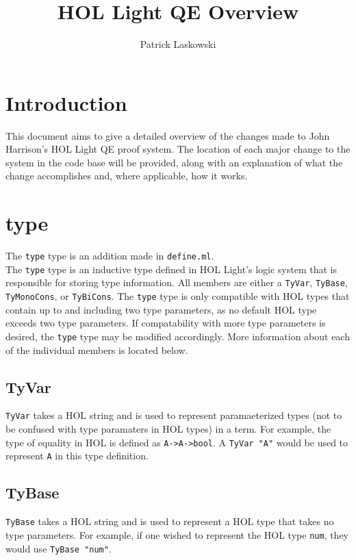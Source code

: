 \documentclass{article}
\def\c#1{\texttt{#1}}
\begin{document}
\title{HOL Light QE Overview}
\author{Patrick Laskowski}

\maketitle
\newpage
\tableofcontents

\newpage
\section{Introduction}
This document aims to give a detailed overview of the changes made to John Harrison's HOL Light QE proof system. The location of each major change to the system in the code base will be provided, along with an explanation of what the change accomplishes and, where applicable, how it works.
\newpage
\section{type}
The \c{type} type is an addition made in \c{define.ml}.\\
The \c{type} type is an inductive type defined in HOL Light's logic system that is responsible for storing type information. All members are either a \c{TyVar}, \c{TyBase}, \c{TyMonoCons}, or \c{TyBiCons}. The \c{type} type is only compatible with HOL types that contain up to and including two type parameters, as no default HOL type exceeds two type parameters. If compatability with more type parameters is desired, the \c{type} type may be modified accordingly. More information about each of the individual members is located below.

\subsection{TyVar}
\c{TyVar} takes a HOL string and is used to represent paramaeterized types (not to be confused with type paramaters in HOL types) in a term. For example, the type of  equality in HOL is defined as \c{A->A->bool}. A \c{TyVar "A"} would be used to represent \c{A} in this type definition.

\subsection{TyBase}
\c{TyBase} takes a HOL string and is used to represent a HOL type that takes no type parameters. For example, if one wished to represent the HOL type \c{num}, they would use \c{TyBase "num"}.
\end{document}
